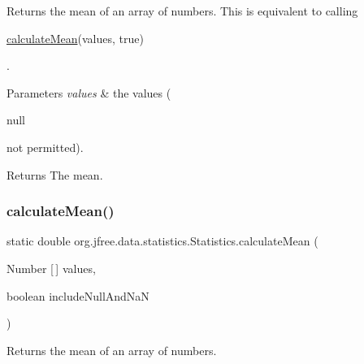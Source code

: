 Returns the mean of an array of numbers. This is equivalent to calling 
\begin{DoxyCode}
\mbox{\hyperlink{classorg_1_1jfree_1_1data_1_1statistics_1_1_statistics_a793d7b5028cb1856231d904d9ab169fd}{calculateMean}}(values, \textcolor{keyword}{true}) 
\end{DoxyCode}
 .


\begin{DoxyParams}{Parameters}
{\em values} & the values (
\begin{DoxyCode}
null 
\end{DoxyCode}
 not permitted).\\
\hline
\end{DoxyParams}
\begin{DoxyReturn}{Returns}
The mean. 
\end{DoxyReturn}
\mbox{\label{classorg_1_1jfree_1_1data_1_1statistics_1_1_statistics_a0a7d049ddd8817616317ebbdfb542dd1}} 
\subsubsection{\texorpdfstring{calculate\+Mean()}{calculateMean()}\hspace{0.1cm}{\footnotesize\ttfamily [2/4]}}
{\footnotesize\ttfamily static double org.\+jfree.\+data.\+statistics.\+Statistics.\+calculate\+Mean (\begin{DoxyParamCaption}\item[{Number \mbox{[}$\,$\mbox{]}}]{values,  }\item[{boolean}]{include\+Null\+And\+NaN }\end{DoxyParamCaption})\hspace{0.3cm}{\ttfamily [static]}}

Returns the mean of an array of numbers.



